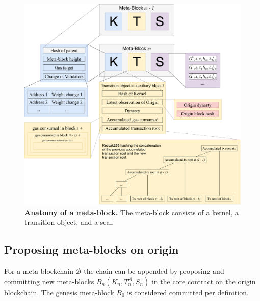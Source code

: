 \documentclass[12pt,a4paper]{article}
\begin{document}

\begin{figure}
    \centering
	\includegraphics[width=\textwidth]{meta_block}
	\caption{\textbf{Anatomy of a meta-block.}
		The meta-block consists of a kernel, a transition object, and a seal.
	}
	\label{fig:meta_block}
\end{figure}

\subsection{Proposing meta-blocks on origin}
\label{proposing_metablocks}

For a meta-blockchain $\mathcal{B}$ the chain can be appended by proposing and committing new meta-blocks $B_n(K_n, T^A_n, S_n)$ in the core contract on the origin block\-chain.
The genesis meta-block $B_0$ is considered committed per definition.
\end{document}
